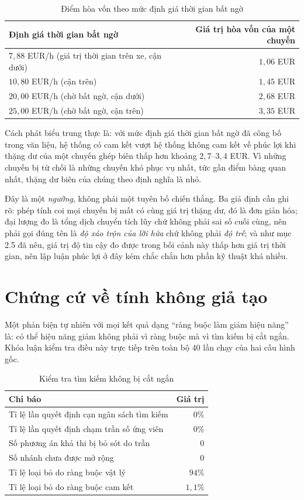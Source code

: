 \begin{table}[htbp]
\centering
\caption{Điểm hòa vốn theo mức định giá thời gian bất ngờ}
\label{bang:hoavon}
\small
\begin{tabular}{@{}lr@{}}
\toprule
\textbf{Định giá thời gian bất ngờ} & \textbf{Giá trị hòa vốn của một chuyến}\\
\midrule
$7{,}88$ EUR/h (giá trị thời gian trên xe, cận dưới) & $1{,}06$ EUR\\
$10{,}80$ EUR/h (cận trên) & $1{,}45$ EUR\\
$20{,}00$ EUR/h (chờ bất ngờ, cận dưới) & $2{,}68$ EUR\\
$25{,}00$ EUR/h (chờ bất ngờ, cận trên) & $3{,}35$ EUR\\
\bottomrule
\end{tabular}
\end{table}

Cách phát biểu trung thực là: với mức định giá thời gian bất ngờ đã công bố trong văn liệu, hệ
thống có cam kết vượt hệ thống không cam kết về phúc lợi khi thặng dư của một chuyến ghép biên
thấp hơn khoảng $2{,}7$--$3{,}4$ EUR. Vì những chuyến bị từ chối là những chuyến khó phục vụ
nhất, tức gần điểm bàng quan nhất, thặng dư biên của chúng theo định nghĩa là nhỏ.

Đây là một \emph{ngưỡng}, không phải một tuyên bố chiến thắng. Ba giả định cần ghi rõ: phép tính
coi mọi chuyến bị mất có cùng giá trị thặng dư, đó là đơn giản hóa; đại lượng đo là tổng dịch
chuyển tích lũy chứ không phải sai số cuối cùng, nên phải gọi đúng tên là \emph{độ xáo trộn của
lời hứa} chứ không phải \emph{độ trễ}; và như mục 2.5 đã nêu, giá trị độ tin cậy đo được trong
bối cảnh này thấp hơn giá trị thời gian, nên lập luận phúc lợi ở đây kém chắc chắn hơn phần kỹ
thuật khá nhiều.

\section{Chứng cứ về tính không giả tạo}
\label{muc:chungcu}

Một phản biện tự nhiên với mọi kết quả dạng ``ràng buộc làm giảm hiệu năng'' là: có thể hiệu
năng giảm không phải vì ràng buộc mà vì tìm kiếm bị cắt ngắn. Khóa luận kiểm tra điều này trực
tiếp trên toàn bộ 40 lần chạy của hai cấu hình gốc.

\begin{table}[htbp]
\centering
\caption{Kiểm tra tìm kiếm không bị cắt ngắn}
\label{bang:khonggiatao}
\small
\begin{tabular}{@{}lr@{}}
\toprule
\textbf{Chỉ báo} & \textbf{Giá trị}\\
\midrule
Tỉ lệ lần quyết định cạn ngân sách tìm kiếm & $0\%$\\
Tỉ lệ lần quyết định chạm trần số ứng viên & $0\%$\\
Số phương án khả thi bị bỏ sót do trần & 0\\
Số nhánh chưa được mở rộng & 0\\
Tỉ lệ loại bỏ do ràng buộc vật lý & $94\%$\\
Tỉ lệ loại bỏ do ràng buộc cam kết & $1{,}1\%$\\
\bottomrule
\end{tabular}
\end{table}

